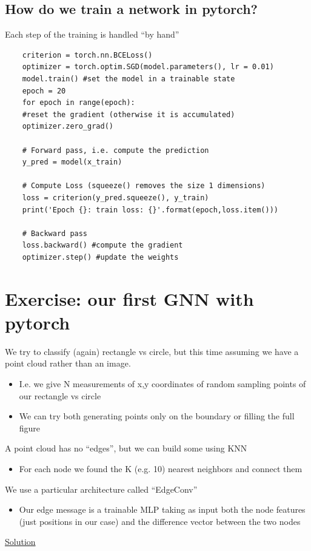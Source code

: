 \subsection{How do we train a network in pytorch?}
Each step of the training is handled “by hand”

\begin{verbatim}
	criterion = torch.nn.BCELoss()
	optimizer = torch.optim.SGD(model.parameters(), lr = 0.01)
	model.train() #set the model in a trainable state
	epoch = 20
	for epoch in range(epoch):
	#reset the gradient (otherwise it is accumulated)
	optimizer.zero_grad()
	
	# Forward pass, i.e. compute the prediction
	y_pred = model(x_train)
	
	# Compute Loss (squeeze() removes the size 1 dimensions)
	loss = criterion(y_pred.squeeze(), y_train)
	print('Epoch {}: train loss: {}'.format(epoch,loss.item()))
	
	# Backward pass
	loss.backward() #compute the gradient
	optimizer.step() #update the weights
\end{verbatim}

\section{Exercise: our first GNN with pytorch}

We try to classify (again) rectangle vs
circle, but this time assuming we have a point cloud rather than an image.

\begin{itemize}
	\item I.e. we give N measurements of x,y
	coordinates of random sampling points of
	our rectangle vs circle
	\item We can try both generating points only on
	the boundary or filling the full figure
\end{itemize}

A point cloud has no “edges”, but we
can build some using KNN
\begin{itemize}
	\item For each node we found the K (e.g. 10)
	nearest neighbors and connect them
\end{itemize}

We use a particular architecture called
“EdgeConv”
\begin{itemize}
	\item Our edge message is a trainable MLP
	taking as input both the node features (just
	positions in our case) and the difference
	vector between the two nodes
\end{itemize}


\href{https://colab.research.google.com/drive/1dPSV1ADBf2oxRyUJeEKeR0VC9ngP02lm#scrollTo=3ke3AYJhuSEY}{Solution}
